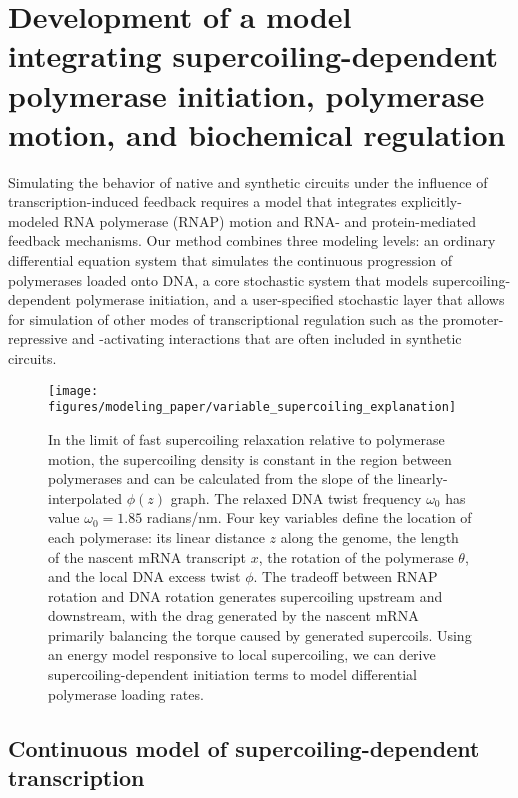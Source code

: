 \documentclass[11pt]{article}
\begin{document}
\section{Development of a model integrating supercoiling-dependent polymerase initiation, polymerase motion, and biochemical regulation}
Simulating the behavior of native and synthetic circuits under the influence of transcription-induced feedback requires a model that integrates explicitly-modeled RNA polymerase (RNAP) motion and RNA- and protein-mediated feedback mechanisms.
Our method combines three modeling levels: an ordinary differential equation system that simulates the continuous progression of polymerases loaded onto DNA, a core stochastic system that models supercoiling-dependent polymerase initiation, and a user-specified stochastic layer that allows for simulation of other modes of transcriptional regulation such as the promoter-repressive and -activating interactions that are often included in synthetic circuits.

\begin{figure}[htb]
    \centering
    \texttt{[image: figures/modeling\_paper/variable\_supercoiling\_explanation]}
    \caption{In the limit of fast supercoiling relaxation relative to polymerase motion, the supercoiling density is constant in the region between polymerases and can be calculated from the slope of the linearly-interpolated \(\phi(z)\) graph. The relaxed DNA twist frequency \(\omega_0\) has value \(\omega_0 = 1.85\) radians/nm. Four key variables define the location of each polymerase: its linear distance \(z\) along the genome, the length of the nascent mRNA transcript \(x\), the rotation of the polymerase \(\theta\), and the local DNA excess twist \(\phi\). The tradeoff between RNAP rotation and DNA rotation generates supercoiling upstream and downstream, with the drag generated by the nascent mRNA primarily balancing the torque caused by generated supercoils. Using an energy model responsive to local supercoiling, we can derive supercoiling-dependent initiation terms to model differential polymerase loading rates.}
    \label{fig:key_variables_diagram}
\end{figure}

\subsection{Continuous model of supercoiling-dependent transcription}
\end{document}
